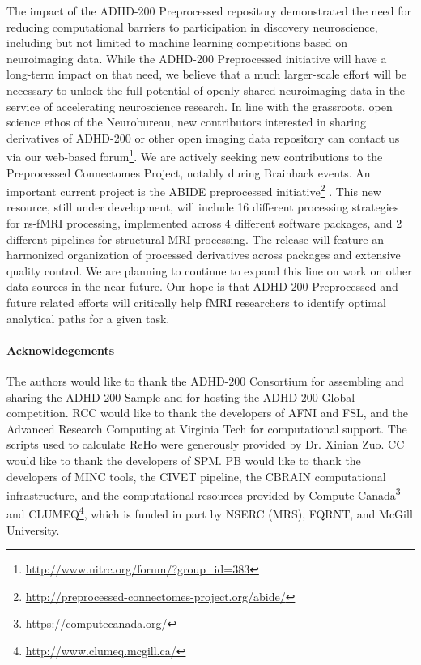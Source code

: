 \documentclass[preprint,12pt,3p]{elsarticle}
\begin{document}
\par
The impact of the ADHD-200 Preprocessed repository demonstrated the need for reducing computational barriers to participation in discovery neuroscience, including but not limited to machine learning competitions based on neuroimaging data. While the ADHD-200 Preprocessed initiative will have a long-term impact on that need, we believe that a much larger-scale effort will be necessary to unlock the full potential of openly shared neuroimaging data in the service of accelerating neuroscience research. In line with the grassroots, open science ethos of the Neurobureau, new contributors interested in sharing derivatives of ADHD-200 or other open imaging data repository can contact us via our web-based forum\footnote{\url{http://www.nitrc.org/forum/?group_id=383}}. We are  actively seeking new contributions to the Preprocessed Connectomes Project, notably during Brainhack events\citep{Cameron_Craddock2016-du}. An important current project is the ABIDE preprocessed initiative\footnote{\url{http://preprocessed-connectomes-project.org/abide/}} \citep{dimartino2014}. This new resource, still under development, will include 16 different processing strategies for rs-fMRI processing, implemented across 4 different software packages, and 2 different pipelines for structural MRI processing. The release will feature an harmonized organization of processed derivatives across packages and extensive quality control. We are planning to continue to expand this line on work on other data sources in the near future. Our hope is that ADHD-200 Preprocessed and future related efforts will critically help fMRI researchers to identify optimal analytical paths for a given task. 

\paragraph{Acknowldegements} The authors would like to thank the ADHD-200 Consortium for assembling and sharing the ADHD-200 Sample and for hosting the ADHD-200 Global competition. RCC would like to thank the developers of AFNI and FSL, and the Advanced Research Computing at Virginia Tech for computational support. The scripts used to calculate ReHo were generously provided by Dr. Xinian Zuo. CC would like to thank the developers of SPM. PB would like to thank the developers of MINC tools, the CIVET pipeline, the CBRAIN computational infrastructure, and the computational resources provided by Compute Canada\footnote{\url{https://computecanada.org/}} and CLUMEQ\footnote{\url{http://www.clumeq.mcgill.ca/}}, which is funded in part by NSERC (MRS), FQRNT, and McGill University.


% 
% 
% 
% 
% 
% 
% 
% 
% 
% 
% 
% 

%

\end{document}

